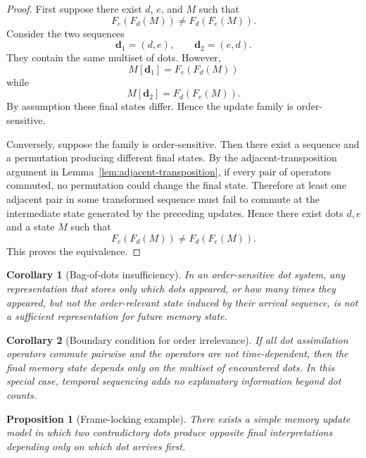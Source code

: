 \documentclass[11pt]{article}
\newtheorem{proposition}{Proposition}
\newtheorem{corollary}{Corollary}
\theoremstyle{remark}
\begin{document}
\begin{proof}
First suppose there exist $d$, $e$, and $M$ such that
$$
F_e(F_d(M))\neq F_d(F_e(M)).
$$
Consider the two sequences
$$
\mathbf d_1=(d,e),
\qquad
\mathbf d_2=(e,d).
$$
They contain the same multiset of dots. However,
$$
M[\mathbf d_1]=F_e(F_d(M))
$$
while
$$
M[\mathbf d_2]=F_d(F_e(M)).
$$
By assumption these final states differ. Hence the update family is
order-sensitive.

Conversely, suppose the family is order-sensitive. Then there exist a
sequence and a permutation producing different final states. By the
adjacent-transposition argument in Lemma~\ref{lem:adjacent-transposition},
if every pair of operators commuted, no permutation could change the
final state. Therefore at least one adjacent pair in some transformed
sequence must fail to commute at the intermediate state generated by the
preceding updates. Hence there exist dots $d,e$ and a state $M$ such
that
$$
F_e(F_d(M))\neq F_d(F_e(M)).
$$
This proves the equivalence.
\end{proof}

\begin{corollary}[Bag-of-dots insufficiency]\label{cor:bag-of-dots-insufficiency}
In an order-sensitive dot system, any representation that stores only
which dots appeared, or how many times they appeared, but not the
order-relevant state induced by their arrival sequence, is not a
sufficient representation for future memory state.
\end{corollary}


\begin{corollary}[Boundary condition for order irrelevance]\label{cor:order-irrelevance}
If all dot assimilation operators commute pairwise and the operators are
not time-dependent, then the final memory state depends only on the
multiset of encountered dots. In this special case, temporal sequencing
adds no explanatory information beyond dot counts.
\end{corollary}


\begin{proposition}[Frame-locking example]\label{prop:frame-locking}
There exists a simple memory update model in which two contradictory
dots produce opposite final interpretations depending only on which dot
arrives first.
\end{proposition}
\end{document}

